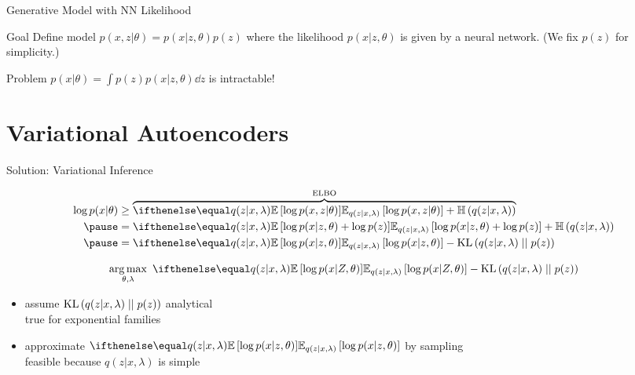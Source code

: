 \begin{frame}{Generative Model with NN Likelihood}
\begin{block}{Goal}
Define model $ p(x,z|\theta) = p(x|z,\theta)p(z) $ where the likelihood $ p(x|z,\theta) $ is given by a neural
network. (We fix $ p(z) $ for simplicity.)
\end{block}

\begin{block}{Problem}
$ p(x|\theta) = \int p(z) p(x|z,\theta)  \dd z $ is intractable!
\end{block}
\end{frame}



\section{Variational Autoencoders}
\frame{\tableofcontents[currentsection]}

\begin{frame}{Solution: Variational Inference}

\vspace{-10pt}
\begin{small}
\begin{equation*}
\begin{aligned}
\log p(x|\theta) &\geq \overbrace{\E[q(z|x, \lambda)]{\log p(x,z|\theta)} + \Ent{q(z|x, \lambda)}}^{\ELBO} \\ 
\pause
&= \E[q(z|x, \lambda)]{\log p(x|z, \theta) + \log p(z)} + \Ent{q(z|x, \lambda)} \\ \pause
&= \E[q(z|x, \lambda)]{\log p(x|z, \theta)} - \KL{q(z|x, \lambda)}{p(z)}
\end{aligned}
\end{equation*}
\end{small}

\pause

\vspace{-20pt}
\begin{equation*}
\argmax_{\theta,\lambda} ~ \E[q(z|x, \lambda)]{\log p(x|Z, \theta)} - \KL{q(z|x, \lambda)}{p(z)}
\end{equation*}


\pause

\begin{itemize}
	\item assume $\operatorname{KL}\left(q(z|x, \lambda)\mid\mid p(z)\right)$  analytical\\
	true for exponential families \pause
	\item approximate $\E[q(z|x, \lambda)]{\log p(x|z, \theta)}$ by sampling\\
	feasible because  $q(z|x, \lambda)$ is simple
\end{itemize}


\end{frame}


